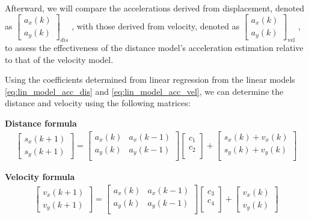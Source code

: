 \hfil

Afterward, we will compare the accelerations derived from displacement, denoted as 
$\begin{bmatrix} a_x(k) \\ a_y(k) \end{bmatrix}_{dis}$
, with those derived from velocity, denoted as 
$\begin{bmatrix} a_x(k) \\ a_y(k) \end{bmatrix}_{\text{vel}}$
, to assess the effectiveness of the distance model's acceleration estimation relative to that of the velocity model.


Using the coefficients determined from linear regression from the linear models \eqref{eq:lin_model_acc_dis} 
and \eqref{eq:lin_model_acc_vel}, we can determine the distance and velocity using the following 
matrices:

\hfil

\textbf{Distance formula}
{\footnotesize
\begin{align}
\label{eq:distance_matrix}
    \begin{bmatrix} s_x(k+1) \\ s_y(k+1) \end{bmatrix}
    =
    \begin{bmatrix} a_x(k) & a_x(k-1)    \\ a_y(k) & a_y(k-1)    \\ \end{bmatrix}
    \begin{bmatrix} c_1 \\ c_2 \\ \end{bmatrix}
    +
    \begin{bmatrix} s_x(k) + v_x(k) \\ s_y(k) + v_y(k) \\ \end{bmatrix}
\end{align} 
}

\hfil

\textbf{Velocity formula}
\begin{align}
\label{eq:velocity_matrix}
    \begin{bmatrix} v_x(k+1) \\ v_y(k+1) \end{bmatrix}
    =
    \begin{bmatrix} a_x(k) & a_x(k-1)    \\ a_y(k) & a_y(k-1)    \\ \end{bmatrix}
    \begin{bmatrix} c_3 \\ c_4 \\ \end{bmatrix}
    +
    \begin{bmatrix} v_x(k) \\ v_y(k) \end{bmatrix}
\end{align}


